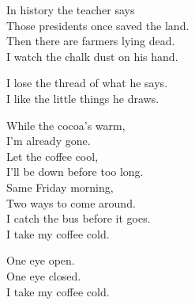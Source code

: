 \begin{lyrics}

In history the teacher says\\
Those presidents once saved the land.\\
Then there are farmers lying dead.\\
I watch the chalk dust on his hand.

I lose the thread of what he says.\\
I like the little things he draws.


While the cocoa’s warm,\\
I’m already gone.\\
Let the coffee cool,\\
I’ll be down before too long.\\
Same Friday morning,\\
Two ways to come around.\\
I catch the bus before it goes.\\
I take my coffee cold.


One eye open.\\
One eye closed.\\
I take my coffee cold.
\end{lyrics}

